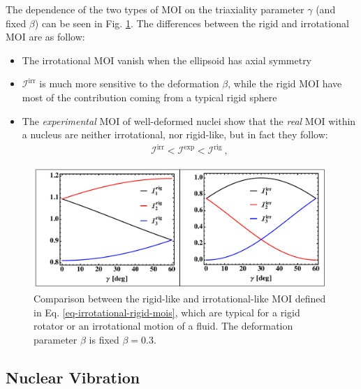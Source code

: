 The dependence of the two types of MOI on the triaxiality parameter $\gamma$ (and fixed $\beta$) can be seen in Fig. \ref{fig-irrotational-rigid-mois}. The differences between the rigid and irrotational MOI are as follow:
\begin{itemize}
    \item The irrotational MOI vanish when the ellipsoid has axial symmetry
    \item $\mathcal{I}^\text{irr}$ is much more sensitive to the deformation $\beta$, while the rigid MOI have most of the contribution coming from a typical rigid sphere
    \item The \emph{experimental} MOI of well-deformed nuclei show that the \emph{real} MOI within a nucleus are neither irrotational, nor rigid-like, but in fact they follow:
    \begin{align}
        \mathcal{I}^\text{irr}<\mathcal{I}^\text{exp}<\mathcal{I}^\text{rig}\ ,
        \label{experimental-MOI-vs-rig-irr}
    \end{align}
\end{itemize}
\begin{figure}
    \centering
    \includegraphics[width=0.99\textwidth]{Chapters/Figures/mois_rig_irr.pdf}
    \caption{Comparison between the rigid-like and irrotational-like MOI defined in Eq. \ref{eq-irrotational-rigid-mois}, which are typical for a rigid rotator or an irrotational motion of a fluid. The deformation parameter $\beta$ is fixed $\beta=0.3$.}
    \label{fig-irrotational-rigid-mois}
\end{figure}

\subsection{Nuclear Vibration}

